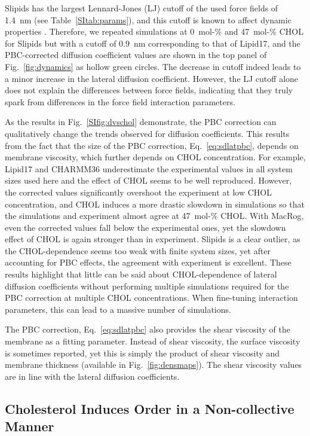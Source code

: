 \documentclass[aps,prl,superscriptaddress]{revtex4-2}
\begin{document}
Slipids has the largest Lennard-Jones (LJ) cutoff of the used force fields of 1.4~nm (see Table~\ref{SItab:params}), and this cutoff is known to affect dynamic properties \cite{leonard2018comparison}. Therefore, we repeated simulations at 0~mol-\% and 47~mol-\% CHOL for Slipids but with a cutoff of 0.9~nm corresponding to that of Lipid17, and the PBC-corrected diffusion coefficient values are shown in the top panel of Fig.~\ref{fig:dynamics} as hollow green circles. The decrease in cutoff indeed leads to a minor increase in the lateral diffusion coefficient. However, the LJ cutoff alone does not explain the differences between force fields, indicating that they truly spark from differences in the force field interaction parameters.

As the results in Fig.~\ref{SIfig:dvschol} demonstrate, the PBC correction can qualitatively change the trends observed for diffusion coefficients. This results from the fact that the size of the PBC correction, Eq.~\eqref{eq:sdlatpbc}, depends on membrane viscosity, which further depends on CHOL concentration. For example, Lipid17 and CHARMM36 underestimate the experimental values in all system sizes used here and the effect of CHOL seems to be well reproduced. However, the corrected values significantly overshoot the experiment at low CHOL concentration, and CHOL induces a more drastic slowdown in simulations so that the simulations and experiment almost agree at 47~mol-\% CHOL. With MacRog, even the corrected values fall below the experimental ones, yet the slowdown effect of CHOL is again stronger than in experiment. Slipids is a clear outlier, as the CHOL-dependence seems too weak with finite system sizes, yet after accounting for PBC effects, the agreement with experiment is excellent. These results highlight that little can be said about CHOL-dependence of lateral diffusion coefficients without performing multiple simulations required for the PBC correction at multiple CHOL concentrations. When fine-tuning interaction parameters, this can lead to a massive number of simulations.

The PBC correction, Eq.~\eqref{eq:sdlatpbc} also provides the shear viscosity of the membrane as a fitting parameter. Instead of shear viscosity, the surface viscosity is sometimes reported, yet this is simply the product of shear viscosity and membrane thickness (available in Fig.~\ref{fig:densmaps}). The shear viscosity values are in line with the lateral diffusion coefficients. 

\subsection{Cholesterol Induces Order in a Non-collective Manner}
\end{document}

